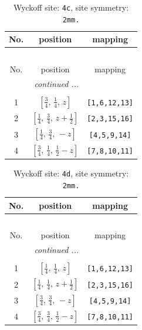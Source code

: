 \documentclass[fleqn,8pt]{jsarticle}
\begin{document}
\renewcommand{\arraystretch}{1.2}
\begin{longtable}{ccc}
\caption{Wyckoff site: {\tt 4c}, site symmetry: {\tt 2mm.}}
 \\
 \hline \hline
No. & position & mapping \\ \hline \endfirsthead

\multicolumn{2}{l}{\tablename\ \thetable{}} \\
 \hline \hline
No. & position & mapping \\ \hline \endhead

 \hline \hline
\multicolumn{2}{r}{\footnotesize\it continued ...} \\ \endfoot

 \hline \hline
\multicolumn{2}{r}{} \\ \endlastfoot

1 & $\left[ \frac{3}{4},\, \frac{1}{4},\, z \right]$ & {\tt [1,6,12,13]} \\ \hline
2 & $\left[ \frac{1}{4},\, \frac{3}{4},\, z + \frac{1}{2} \right]$ & {\tt [2,3,15,16]} \\ \hline
3 & $\left[ \frac{1}{4},\, \frac{3}{4},\, - z \right]$ & {\tt [4,5,9,14]} \\ \hline
4 & $\left[ \frac{3}{4},\, \frac{1}{4},\, \frac{1}{2} - z \right]$ & {\tt [7,8,10,11]} \\
\end{longtable}
\renewcommand{\arraystretch}{1.2}
\begin{longtable}{ccc}
\caption{Wyckoff site: {\tt 4d}, site symmetry: {\tt 2mm.}}
 \\
 \hline \hline
No. & position & mapping \\ \hline \endfirsthead

\multicolumn{2}{l}{\tablename\ \thetable{}} \\
 \hline \hline
No. & position & mapping \\ \hline \endhead

 \hline \hline
\multicolumn{2}{r}{\footnotesize\it continued ...} \\ \endfoot

 \hline \hline
\multicolumn{2}{r}{} \\ \endlastfoot

1 & $\left[ \frac{1}{4},\, \frac{1}{4},\, z \right]$ & {\tt [1,6,12,13]} \\ \hline
2 & $\left[ \frac{1}{4},\, \frac{1}{4},\, z + \frac{1}{2} \right]$ & {\tt [2,3,15,16]} \\ \hline
3 & $\left[ \frac{3}{4},\, \frac{3}{4},\, - z \right]$ & {\tt [4,5,9,14]} \\ \hline
4 & $\left[ \frac{3}{4},\, \frac{3}{4},\, \frac{1}{2} - z \right]$ & {\tt [7,8,10,11]} \\
\end{longtable}
\end{document}
